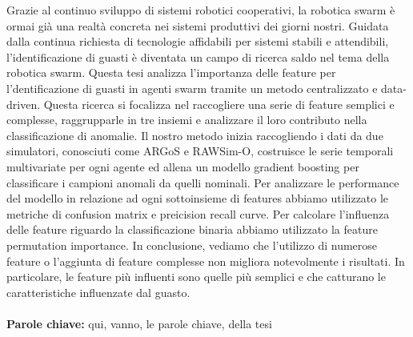 \documentclass[../../Thesis.tex]{subfiles}
\begin{document}
	Grazie al continuo sviluppo di sistemi robotici cooperativi, la robotica swarm è ormai già una realtà concreta nei sistemi produttivi dei giorni nostri. Guidata dalla continua richiesta di tecnologie affidabili per sistemi stabili e attendibili, l'identificazione di guasti è diventata un campo di ricerca saldo nel tema della robotica swarm. Questa tesi analizza l'importanza delle feature per l'dentificazione di guasti in agenti swarm tramite un metodo centralizzato e data-driven. Questa ricerca si focalizza nel raccogliere una serie di feature semplici e complesse, raggrupparle in tre insiemi e analizzare il loro contributo nella classificazione di anomalie. Il nostro metodo inizia raccogliendo i dati da due simulatori, conosciuti come ARGoS e RAWSim-O, costruisce le serie temporali multivariate per ogni agente ed allena un modello gradient boosting per classificare i campioni anomali da quelli nominali. Per analizzare le performance del modello in relazione ad ogni sottoinsieme di features abbiamo utilizzato le metriche di confusion matrix e preicision recall curve. Per calcolare l'influenza delle feature riguardo la classificazione binaria abbiamo utilizzato la feature permutation importance. In conclusione, vediamo che l'utilizzo di numerose feature o l'aggiunta di feature complesse non migliora notevolmente i risultati. In particolare, le feature più influenti sono quelle più semplici e che catturano le caratteristiche influenzate dal guasto.
	\\
	\\
	\textbf{Parole chiave:} qui, vanno, le parole chiave, della tesi %
\end{document}
